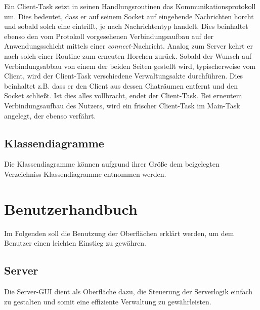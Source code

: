 \documentclass[12pt,a4paper,bibliography=totocnumbered,listof=totocnumbered]{scrartcl}
\begin{document}
Ein Client-Task setzt in seinen Handlungsroutinen das Kommunikationsprotokoll um. Dies bedeutet, dass er auf seinem Socket auf eingehende Nachrichten horcht und sobald solch eine eintrifft, je nach Nachrichtentyp handelt. Dies beinhaltet ebenso den vom Protokoll vorgesehenen Verbindungsaufbau auf der Anwendungsschicht mittels einer \textit{connect}-Nachricht. Analog zum Server kehrt er nach solch einer Routine zum erneuten Horchen zurück. Sobald der Wunsch auf Verbindungsabbau von einem der beiden Seiten gestellt wird, typischerweise vom Client, wird der Client-Task verschiedene Verwaltungsakte durchführen. Dies beinhaltet z.B. dass er den Client aus dessen Chaträumen entfernt und den Socket schließt. Ist dies alles vollbracht, endet der Client-Task. Bei erneutem Verbindungsaufbau des Nutzers, wird ein frischer Client-Task im Main-Task angelegt, der ebenso verfährt.

\subsection{Klassendiagramme}
Die Klassendiagramme können aufgrund ihrer Größe dem beigelegten Verzeichniss 
\glqq Klassendiagramme\grqq{} entnommen werden.


\newpage
\section{Benutzerhandbuch}
Im Folgenden soll die Benutzung der Oberflächen erklärt werden, um dem Benutzer einen leichten Einstieg zu gewähren.
\subsection{Server}
Die Server-GUI dient als Oberfläche dazu, die Steuerung der Serverlogik einfach zu gestalten und somit eine effiziente Verwaltung zu gewährleisten.
\end{document}
